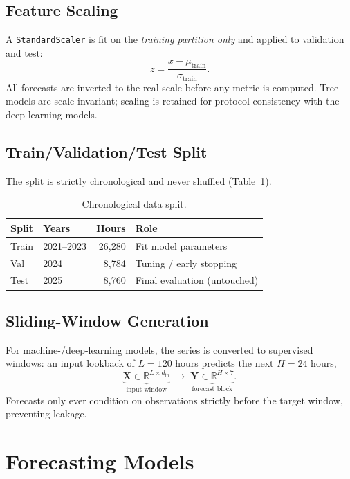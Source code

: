\documentclass[12pt,a4paper,oneside]{report}
\begin{document}
\section{Feature Scaling}
A \texttt{StandardScaler} is fit on the \emph{training partition only} and applied
to validation and test:
\[
  z = \frac{x - \mu_{\text{train}}}{\sigma_{\text{train}}}.
\]
All forecasts are inverted to the real scale before any metric is computed.
Tree models are scale-invariant; scaling is retained for protocol consistency
with the deep-learning models.

\section{Train/Validation/Test Split}
The split is strictly chronological and never shuffled (Table~\ref{tab:split}).

\begin{table}[H]
\centering
\caption{Chronological data split.}
\label{tab:split}
\begin{tabular}{llrl}
\toprule
\textbf{Split} & \textbf{Years} & \textbf{Hours} & \textbf{Role} \\
\midrule
Train & 2021--2023 & 26{,}280 & Fit model parameters \\
Val   & 2024       &  8{,}784 & Tuning / early stopping \\
Test  & 2025       &  8{,}760 & Final evaluation (untouched) \\
\bottomrule
\end{tabular}
\end{table}

\section{Sliding-Window Generation}
\label{sec:windows}
For machine-/deep-learning models, the series is converted to supervised windows:
an input lookback of $L = 120$ hours predicts the next $H = 24$ hours,
\[
  \underbrace{\mathbf{X} \in \mathbb{R}^{L \times d_{\text{in}}}}_{\text{input window}}
  \;\longrightarrow\;
  \underbrace{\mathbf{Y} \in \mathbb{R}^{H \times 7}}_{\text{forecast block}} .
\]
Forecasts only ever condition on observations strictly before the target window,
preventing leakage.

\chapter{Forecasting Models}
\label{ch:models}
\end{document}

